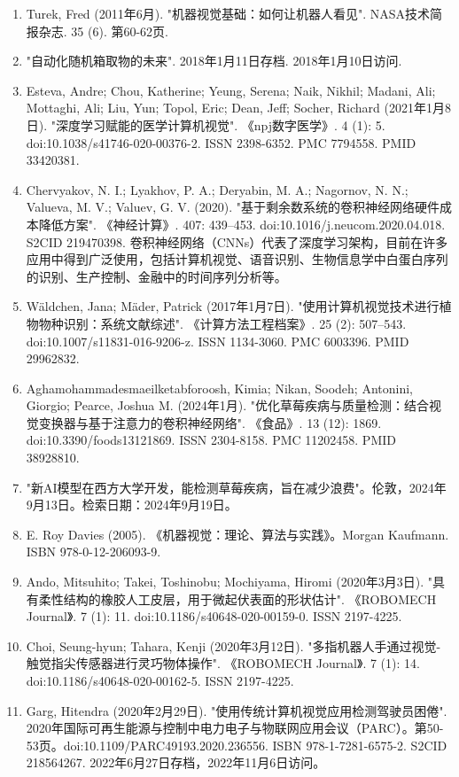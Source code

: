 \begin{enumerate}
\item Turek, Fred (2011年6月). "机器视觉基础：如何让机器人看见". NASA技术简报杂志. 35 (6). 第60-62页.
\item "自动化随机箱取物的未来". 2018年1月11日存档. 2018年1月10日访问.
\item Esteva, Andre; Chou, Katherine; Yeung, Serena; Naik, Nikhil; Madani, Ali; Mottaghi, Ali; Liu, Yun; Topol, Eric; Dean, Jeff; Socher, Richard (2021年1月8日). "深度学习赋能的医学计算机视觉". 《npj数字医学》. 4 (1): 5. doi:10.1038/s41746-020-00376-2. ISSN 2398-6352. PMC 7794558. PMID 33420381.
\item Chervyakov, N. I.; Lyakhov, P. A.; Deryabin, M. A.; Nagornov, N. N.; Valueva, M. V.; Valuev, G. V. (2020). "基于剩余数系统的卷积神经网络硬件成本降低方案". 《神经计算》. 407: 439–453. doi:10.1016/j.neucom.2020.04.018. S2CID 219470398. 卷积神经网络（CNNs）代表了深度学习架构，目前在许多应用中得到广泛使用，包括计算机视觉、语音识别、生物信息学中白蛋白序列的识别、生产控制、金融中的时间序列分析等。
\item Wäldchen, Jana; Mäder, Patrick (2017年1月7日). "使用计算机视觉技术进行植物物种识别：系统文献综述". 《计算方法工程档案》. 25 (2): 507–543. doi:10.1007/s11831-016-9206-z. ISSN 1134-3060. PMC 6003396. PMID 29962832.
\item Aghamohammadesmaeilketabforoosh, Kimia; Nikan, Soodeh; Antonini, Giorgio; Pearce, Joshua M. (2024年1月). "优化草莓疾病与质量检测：结合视觉变换器与基于注意力的卷积神经网络". 《食品》. 13 (12): 1869. doi:10.3390/foods13121869. ISSN 2304-8158. PMC 11202458. PMID 38928810.
\item "新AI模型在西方大学开发，能检测草莓疾病，旨在减少浪费"。伦敦，2024年9月13日。检索日期：2024年9月19日。
\item E. Roy Davies (2005). 《机器视觉：理论、算法与实践》。Morgan Kaufmann. ISBN 978-0-12-206093-9.
\item Ando, Mitsuhito; Takei, Toshinobu; Mochiyama, Hiromi (2020年3月3日). "具有柔性结构的橡胶人工皮层，用于微起伏表面的形状估计". 《ROBOMECH Journal》. 7 (1): 11. doi:10.1186/s40648-020-00159-0. ISSN 2197-4225.
\item Choi, Seung-hyun; Tahara, Kenji (2020年3月12日). "多指机器人手通过视觉-触觉指尖传感器进行灵巧物体操作". 《ROBOMECH Journal》. 7 (1): 14. doi:10.1186/s40648-020-00162-5. ISSN 2197-4225.
\item Garg, Hitendra (2020年2月29日). "使用传统计算机视觉应用检测驾驶员困倦". 2020年国际可再生能源与控制中电力电子与物联网应用会议（PARC）。第50-53页。doi:10.1109/PARC49193.2020.236556. ISBN 978-1-7281-6575-2. S2CID 218564267. 2022年6月27日存档，2022年11月6日访问。

\end{enumerate}
